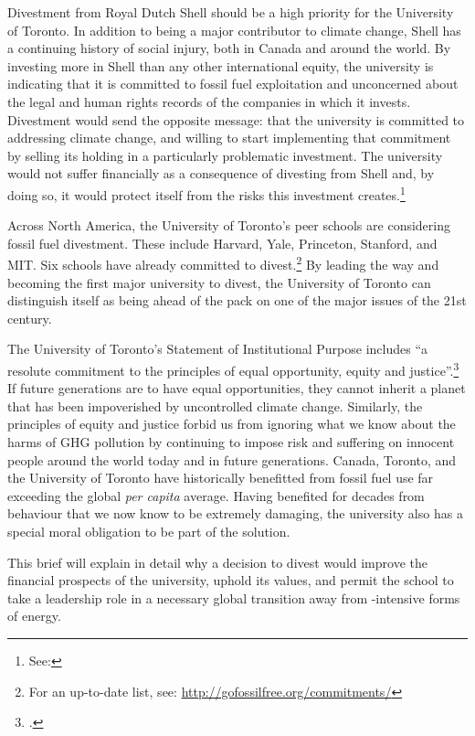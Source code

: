 \documentclass[10pt]{article}
\begin{document}
Divestment from Royal Dutch Shell should be a high priority for the University of Toronto. 
In addition to being a major contributor to climate change, Shell has a continuing history of social injury, both in Canada and around the world. 
By investing more in Shell than any other international equity, the university is indicating that it is committed to fossil fuel exploitation and unconcerned about the legal and human rights records of the companies in which it invests.
Divestment would send the opposite message: that the university is committed to addressing climate change, and willing to start implementing that commitment by selling its holding in a particularly problematic investment.  
The university would not suffer financially as a consequence of divesting from Shell and, by doing so, it would protect itself from the risks this investment creates.\footnote{See: }



Across North America, the University of Toronto's peer schools are considering fossil fuel divestment.
These include Harvard, Yale, Princeton, Stanford, and MIT.
Six schools have already committed to divest.\footnote{For an up-to-date list, see: \url{http://gofossilfree.org/commitments/}}
By leading the way and becoming the first major university to divest, the University of Toronto can distinguish itself as being ahead of the pack on one of the major issues of the 21st century.




The University of Toronto's Statement of Institutional Purpose includes ``a resolute commitment to the principles of equal opportunity, equity and justice''.\footcite{InstitutionalPurpose}
If future generations are to have equal opportunities, they cannot inherit a planet that has been impoverished by uncontrolled climate change.
Similarly, the principles of equity and justice forbid us from ignoring what we know about the harms of GHG pollution by continuing to impose risk and suffering on innocent people around the world today and in future generations.
Canada, Toronto, and the University of Toronto have historically benefitted from fossil fuel use far exceeding the global \emph{per capita} average.
Having benefited for decades from behaviour that we now know to be extremely damaging, the university also has a special moral obligation to be part of the solution.



This brief will explain in detail why a decision to divest would improve the financial prospects of the university, uphold its values, and permit the school to take a leadership role in a necessary global transition away from -intensive forms of energy. 
\end{document}
